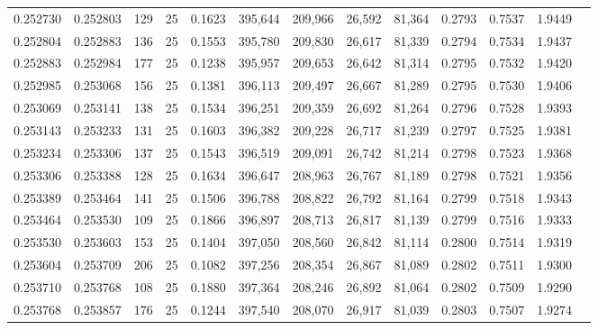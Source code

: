 \begin{tabular}{rrrrrrrrrrrrr}
0.252730 & 0.252803 &   129 &  25 &                                     0.1623 & 395,644 & 209,966 &  26,592 &  81,364 & 0.2793 & 0.7537 & 1.9449 \\
0.252804 & 0.252883 &   136 &  25 &                                     0.1553 & 395,780 & 209,830 &  26,617 &  81,339 & 0.2794 & 0.7534 & 1.9437 \\
0.252883 & 0.252984 &   177 &  25 &                                     0.1238 & 395,957 & 209,653 &  26,642 &  81,314 & 0.2795 & 0.7532 & 1.9420 \\
0.252985 & 0.253068 &   156 &  25 &                                     0.1381 & 396,113 & 209,497 &  26,667 &  81,289 & 0.2795 & 0.7530 & 1.9406 \\
0.253069 & 0.253141 &   138 &  25 &                                     0.1534 & 396,251 & 209,359 &  26,692 &  81,264 & 0.2796 & 0.7528 & 1.9393 \\
0.253143 & 0.253233 &   131 &  25 &                                     0.1603 & 396,382 & 209,228 &  26,717 &  81,239 & 0.2797 & 0.7525 & 1.9381 \\
0.253234 & 0.253306 &   137 &  25 &                                     0.1543 & 396,519 & 209,091 &  26,742 &  81,214 & 0.2798 & 0.7523 & 1.9368 \\
0.253306 & 0.253388 &   128 &  25 &                                     0.1634 & 396,647 & 208,963 &  26,767 &  81,189 & 0.2798 & 0.7521 & 1.9356 \\
0.253389 & 0.253464 &   141 &  25 &                                     0.1506 & 396,788 & 208,822 &  26,792 &  81,164 & 0.2799 & 0.7518 & 1.9343 \\
0.253464 & 0.253530 &   109 &  25 &                                     0.1866 & 396,897 & 208,713 &  26,817 &  81,139 & 0.2799 & 0.7516 & 1.9333 \\
0.253530 & 0.253603 &   153 &  25 &                                     0.1404 & 397,050 & 208,560 &  26,842 &  81,114 & 0.2800 & 0.7514 & 1.9319 \\
0.253604 & 0.253709 &   206 &  25 &                                     0.1082 & 397,256 & 208,354 &  26,867 &  81,089 & 0.2802 & 0.7511 & 1.9300 \\
0.253710 & 0.253768 &   108 &  25 &                                     0.1880 & 397,364 & 208,246 &  26,892 &  81,064 & 0.2802 & 0.7509 & 1.9290 \\
0.253768 & 0.253857 &   176 &  25 &                                     0.1244 & 397,540 & 208,070 &  26,917 &  81,039 & 0.2803 & 0.7507 & 1.9274 \\

\end{tabular}
